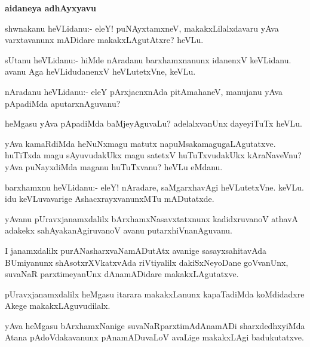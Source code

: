 \begin{center}
\textbf{\Large aidaneya adhAyxyavu}
\end{center}

\begin{mng}
shwnakanu heVLidanu:- eleY! puNAyxtamxneV, makakxLilalxdavaru yAva varxtavanunx mADidare makakxLAgutAtxre? heVLu.
\end{mng}

\begin{mng}
sUtanu heVLidanu:- hiMde nAradanu barxhamxnanunx idanenxV keVLidanu. avanu Aga heVLidudanenxV heVLutetxVne, keVLu.
\end{mng}

\begin{mng}
nAradanu heVLidanu:- eleY pArxjacnxnAda pitAmahaneV, manujanu yAva pApadiMda aputarxnAguvanu?
\end{mng}

\begin{mng}
heMgasu yAva pApadiMda baMjeyAguvaLu? adelalxvanUnx dayeyiTuTx heVLu.
\end{mng}

\begin{mng}
yAva kamaRdiMda heNuNxmagu matutx napuMsakamagugaLAgutatxve. huTiTxda magu sAyuvudakUkx magu satetxV huTuTxvudakUkx kAraNaveVnu? yAva puNayxdiMda maganu huTuTxvanu? heVLu eMdanu.
\end{mng}

\begin{mng}
barxhamxnu heVLidanu:- eleY! nAradare, saMgarxhavAgi heVLutetxVne. keVLu. idu keVLuvavarige AshacxrayxvanunxMTu mADutatxde.
\end{mng}

\begin{mng}
yAvanu pUravxjanamxdalilx bArxhamxNasavxtatxnunx kadidxruvanoV athavA adakekx sahAyakanAgiruvanoV avanu putarxhiVnanAguvanu.
\end{mng}

\begin{mng}
I janamxdalilx purANasharxvaNamADutAtx avanige sasayxsahitavAda BUmiyanunx shAsotxrXVkatxvAda riVtiyalilx dakiSxNeyoDane goVvanUnx, suvaNaR parxtimeyanUnx dAnamADidare makakxLAgutatxve.
\end{mng}

\begin{mng}
pUravxjanamxdalilx heMgasu itarara makakxLanunx kapaTadiMda koMdidadxre Akege makakxLAguvudilalx.
\end{mng}

\begin{mng}
yAva heMgasu bArxhamxNanige suvaNaRparxtimAdAnamADi sharxdedhxyiMda Atana pAdoVdakavanunx pAnamADuvaLoV avaLige makakxLAgi badukutatxve.
\end{mng}

